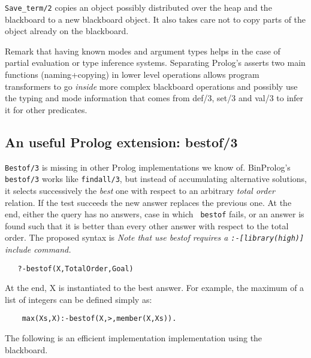 \documentclass{article}
\begin{document}
{\tt Save\_term/2} copies an object possibly distributed over the heap  and the blackboard to a new blackboard object. It also takes care not to copy parts of the object already on the blackboard.

Remark that having known modes and argument types helps in the case of
partial evaluation or type inference systems.
Separating Prolog's asserts two main functions (naming+copying) in
lower level operations allows program transformers to go {\em inside}
more complex blackboard operations and possibly use the typing and mode information that comes from def/3, set/3 and val/3 to infer it for other predicates.

\subsection{An useful Prolog extension: bestof/3}

{\tt Bestof/3} is missing in other Prolog implementations we
know of.  BinProlog's {\tt bestof/3} works like {\tt findall/3}, but
instead of accumulating alternative solutions, it selects successively
the {\em best} one with respect to an arbitrary {\em total order}
relation. If the test succeeds the new answer replaces the previous
one. At the end, either the query has no answers, case in which {\tt
bestof} fails, or an answer is found such that it is better than every
other answer with respect to the total order. The proposed syntax is
{\em Note that use bestof requires a \verb~:-[library(high)]~ include command.}

\begin{verbatim}
   ?-bestof(X,TotalOrder,Goal)
\end{verbatim}

At the end, X is instantiated to the best answer. For example, the maximum of a list of integers can be defined simply as:

\begin{verbatim}
    max(Xs,X):-bestof(X,>,member(X,Xs)).
\end{verbatim}

The following is an efficient implementation
implementation using the blackboard.
\end{document}
